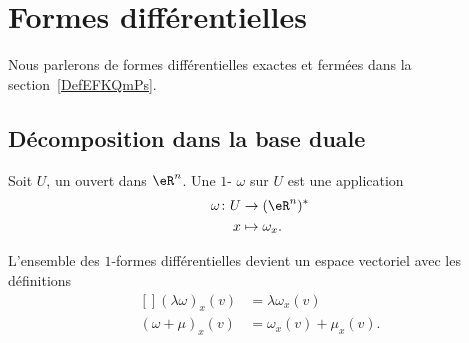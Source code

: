 
\section{Formes différentielles}
\label{SecFormDiffRappel}

Nous parlerons de formes différentielles exactes et fermées dans la section~\ref{DefEFKQmPs}.

\subsection{Décomposition dans la base duale}

\begin{definition}      \label{DEFooMGXSooWioKie}
	Soit \( U\), un ouvert dans \( \eR^n\). Une \( 1\)- \( \omega\) sur \( U\) est une application
	\begin{equation}
		\begin{aligned}
			\omega\colon U & \to (\eR^n)^*     \\
			x              & \mapsto \omega_x.
		\end{aligned}
	\end{equation}
\end{definition}

\begin{remark}      \label{REMooSKKSooDZFMAr}
	L'ensemble des \( 1\)-formes différentielles devient un espace vectoriel avec les définitions
	\begin{equation}
		\begin{aligned}[]
			(\lambda\omega)_x(v) & =\lambda\omega_x(v)    \\
			(\omega+\mu)_x(v)    & =\omega_x(v)+\mu_x(v).
		\end{aligned}
	\end{equation}
\end{remark}

